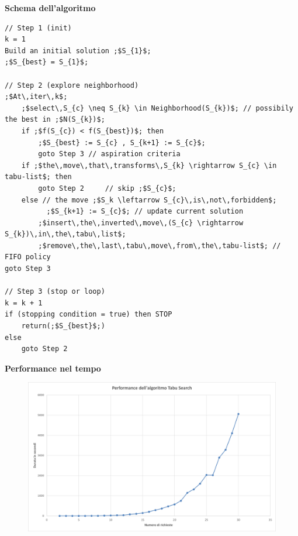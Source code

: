 \documentclass[9pt]{beamer}
\begin{document}
\begin{frame}{\subsecname}
\framebreak

	\textbf{Schema dell'algoritmo}
\begin{verbatim}
// Step 1 (init)
k = 1
Build an initial solution ;$S_{1}$;
;$S_{best} = S_{1}$;

// Step 2 (explore neighborhood)
;$At\,iter\,k$;
	;$select\,S_{c} \neq S_{k} \in Neighborhood(S_{k})$; // possibily the best in ;$N(S_{k})$;
	if ;$f(S_{c}) < f(S_{best})$; then	
		;$S_{best} := S_{c} , S_{k+1} := S_{c}$;
		goto Step 3 // aspiration criteria
	if ;$the\,move\,that\,transforms\,S_{k} \rightarrow S_{c} \in tabu-list$; then
		goto Step 2 	// skip ;$S_{c}$;
	else // the move ;$S_k \leftarrow S_{c}\,is\,not\,forbidden$;
	      ;$S_{k+1} := S_{c}$; // update current solution
		;$insert\,the\,inverted\,move\,(S_{c} \rightarrow S_{k})\,in\,the\,tabu\,list$;
		;$remove\,the\,last\,tabu\,move\,from\,the\,tabu-list$; // FIFO policy
goto Step 3

// Step 3 (stop or loop)
k = k + 1
if (stopping condition = true) then STOP
	return(;$S_{best}$;)
else
	goto Step 2
\end{verbatim}

\framebreak
	\textbf{Performance nel tempo}
      	\begin{figure}[h]
	\centering
	\includegraphics[width=\textwidth]
	{../charts/12 Performance dell'algoritmo Tabu Search}
	\end{figure}
\end{frame}

\end{document}
